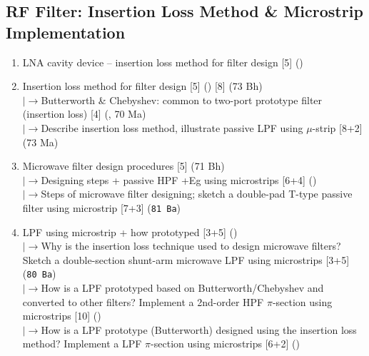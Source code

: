 \documentclass[12pt]{article}
\newcommand{\lb}{\\$\left|\rightarrow\right.$}
\begin{document}
  \subsection{RF Filter: Insertion Loss Method \& Microstrip Implementation}
    \begin{enumerate}[topsep=0pt, noitemsep]
      \item LNA cavity device -- insertion loss method for filter design \hfill [5] ()
      \item Insertion loss method for filter design \hfill [5] () [8] (73 Bh)
        \lb Butterworth \& Chebyshev: common to two-port prototype filter (insertion loss) \hfill [4] (, 70 Ma)
        \lb Describe insertion loss method, illustrate passive LPF using $\mu$-strip \hfill [8+2] (73 Ma)
      \item Microwave filter design procedures \hfill [5] (71 Bh)
        \lb Designing steps + passive HPF +Eg using microstrips \hfill [6+4] ()
        \lb Steps of microwave filter designing; sketch a double-pad T-type passive filter using microstrip \hfill [7+3] (\texttt{81 Ba})
      \item LPF using microstrip + how prototyped \hfill [3+5] ()
        \lb Why is the insertion loss technique used to design microwave filters? Sketch a double-section shunt-arm microwave LPF using microstrips \hfill [3+5] (\texttt{80 Ba})
        \lb How is a LPF prototyped based on Butterworth/Chebyshev and converted to other filters? Implement a 2nd-order HPF $\pi$-section using microstrips \hfill [10] ()
        \lb How is a LPF prototype (Butterworth) designed using the insertion loss method? Implement a LPF $\pi$-section using microstrips \hfill [6+2] ()
    \end{enumerate}
\end{document}

